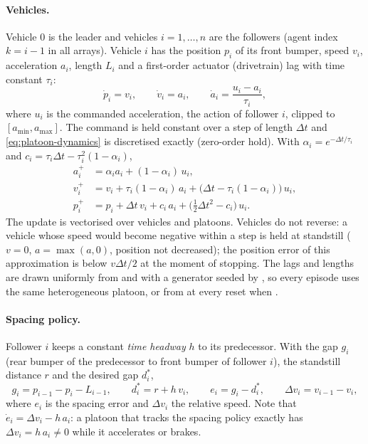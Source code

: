 \paragraph{Vehicles.} Vehicle $0$ is the leader and vehicles $i = 1, \dots, n$
are the followers (agent index $k = i - 1$ in all arrays). Vehicle $i$ has the
position $p_i$ of its front bumper, speed $v_i$, acceleration $a_i$, length
$L_i$ and a first-order actuator (drivetrain) lag with time constant $\tau_i$:
\begin{equation}
  \dot p_i = v_i, \qquad \dot v_i = a_i, \qquad
  \dot a_i = \frac{u_i - a_i}{\tau_i},
  \label{eq:platoon-dynamics}
\end{equation}
where $u_i$ is the commanded acceleration, the action of follower $i$, clipped
to $[a_{\min}, a_{\max}]$. The command is held constant over a step of length
$\Delta t$ and \eqref{eq:platoon-dynamics} is discretised exactly (zero-order
hold). With $\alpha_i = e^{-\Delta t/\tau_i}$ and
$c_i = \tau_i \Delta t - \tau_i^2 (1 - \alpha_i)$,
\begin{align}
  a_i^{+} &= \alpha_i a_i + (1 - \alpha_i)\, u_i, \\
  v_i^{+} &= v_i + \tau_i (1 - \alpha_i)\, a_i
             + \bigl(\Delta t - \tau_i (1 - \alpha_i)\bigr)\, u_i, \\
  p_i^{+} &= p_i + \Delta t\, v_i + c_i\, a_i + \bigl(\tfrac12 \Delta t^2 - c_i\bigr)\, u_i .
\end{align}
The update is vectorised over vehicles and platoons. Vehicles do not reverse: a
vehicle whose speed would become negative within a step is held at standstill
($v = 0$, $a = \max(a, 0)$, position not decreased); the position error of this
approximation is below $v \Delta t / 2$ at the moment of stopping. The lags and
lengths are drawn uniformly from  and  with a
generator seeded by , so every episode uses the same
heterogeneous platoon, or from  at every reset when
.

\paragraph{Spacing policy.} Follower $i$ keeps a constant \emph{time headway}
$h$ to its predecessor. With the gap $g_i$ (rear bumper of the predecessor to
front bumper of follower $i$), the standstill distance $r$ and the desired gap
$d_i^{*}$,
\begin{equation}
  g_i = p_{i-1} - p_i - L_{i-1}, \qquad d_i^{*} = r + h\, v_i, \qquad
  e_i = g_i - d_i^{*}, \qquad \Delta v_i = v_{i-1} - v_i,
  \label{eq:platoon-spacing}
\end{equation}
where $e_i$ is the spacing error and $\Delta v_i$ the relative speed. Note that
$\dot e_i = \Delta v_i - h\, a_i$: a platoon that tracks the spacing policy
exactly has $\Delta v_i = h\, a_i \neq 0$ while it accelerates or brakes.

